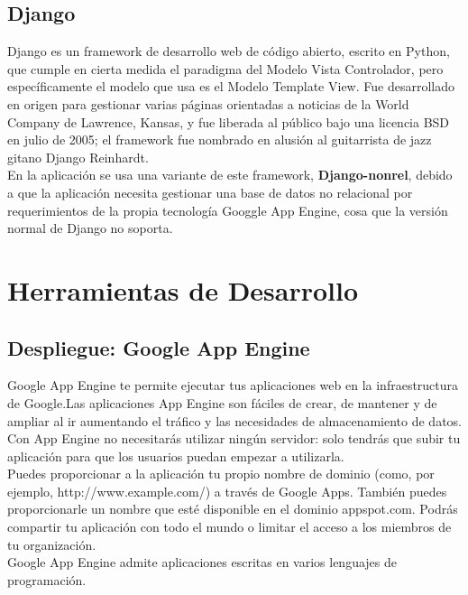 \subsection{Django}
Django es un framework de desarrollo web de código abierto, escrito en Python, que cumple en cierta medida el paradigma del Modelo Vista Controlador, 
pero específicamente el modelo que usa es el Modelo Template View. Fue desarrollado en origen para gestionar varias páginas orientadas a noticias de la World Company de Lawrence, Kansas, 
y fue liberada al público bajo una licencia BSD en julio de 2005; el framework fue nombrado en alusión al guitarrista de jazz gitano Django Reinhardt.\\

En la aplicación se usa una variante de este framework, \textbf{Django-nonrel}, debido a que la aplicación necesita gestionar una base de datos no relacional por requerimientos
de la propia tecnología Googgle App Engine, cosa que la versión normal de Django no soporta.




\section{Herramientas de Desarrollo}
\label{2:sec3}

\subsection{Despliegue: Google App Engine}
Google App Engine te permite ejecutar tus aplicaciones web en la infraestructura de Google.Las 
aplicaciones App Engine son fáciles de crear, de mantener y de ampliar al ir aumentando el tráfico 
y las necesidades de almacenamiento de datos. Con App Engine no necesitarás utilizar ningún servidor: 
solo tendrás que subir tu aplicación para que los usuarios puedan empezar a utilizarla.\\

Puedes proporcionar a la aplicación tu propio nombre de dominio (como, por ejemplo, http://www.example.com/) 
a través de Google Apps. También puedes proporcionarle un nombre que esté disponible en el dominio appspot.com. 
Podrás compartir tu aplicación con todo el mundo o limitar el acceso a los miembros de tu organización.\\

Google App Engine admite aplicaciones escritas en varios lenguajes de programación.\\

